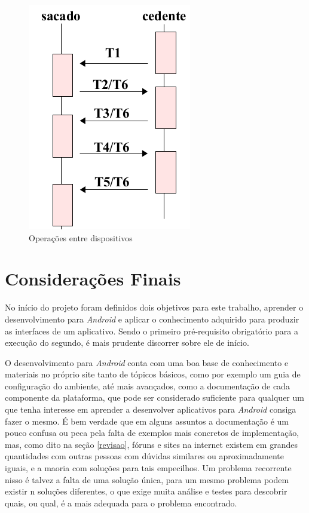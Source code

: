 \documentclass[hidelinks,12pt]{article}
\begin{document}
\begin{figure}[H]
	\centering
	\includegraphics[scale=0.5]{transactions} 
	\caption{Opera\c{c}\~oes entre dispositivos}
	\label{transactions}
\end{figure}

\section{Considera\c{c}\~oes Finais}
No in\'icio do projeto foram definidos dois objetivos para este trabalho, aprender o desenvolvimento para \textit{Android} e aplicar o conhecimento adquirido para produzir as interfaces de um aplicativo. Sendo o primeiro pr\'e-requisito obrigat\'orio para a execu\c{c}\~ao do segundo, \'e mais prudente discorrer sobre ele de in\'icio.

O desenvolvimento para \textit{Android} conta com uma boa base de conhecimento e materiais no pr\'oprio site tanto de t\'opicos b\'asicos, como por exemplo um guia de configura\c{c}\~ao do ambiente, at\'e mais avan\c{c}ados, como a documenta\c{c}\~ao de cada componente da plataforma, que pode ser considerado suficiente para qualquer um que tenha interesse em aprender a desenvolver aplicativos para \textit{Android} consiga fazer o mesmo. É bem verdade que em alguns assuntos a documenta\c{c}\~ao \'e um pouco confusa ou peca pela falta de exemplos mais concretos de implementa\c{c}\~ao, mas, como dito na se\c{c}\~ao \ref{revisao}, f\'oruns e sites na internet existem em grandes quantidades com outras pessoas com d\'uvidas similares ou aproximadamente iguais, e a maoria com solu\c{c}\~oes para tais empecilhos. Um problema recorrente nisso \'e talvez a falta de uma solu\c{c}\~ao \'unica, para um mesmo problema podem existir n solu\c{c}\~oes diferentes, o que exige muita an\'alise e testes para descobrir quais, ou qual, \'e a mais adequada para o problema encontrado.
\end{document}

